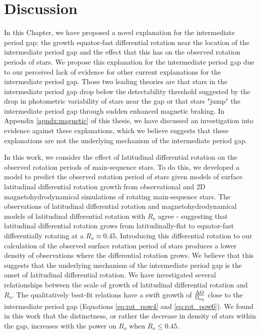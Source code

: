 \section{Discussion}
\label{sec:discussion}

In this Chapter, we have proposed a novel explanation for the intermediate period gap: the growth equator-fast differential rotation near the location of the intermediate period gap and the effect that this has on the observed rotation periods of stars.
We propose this explanation for the intermediate period gap due to our perceived lack of evidence for other current explanations for the intermediate period gap.
Those two leading theories are that stars in the intermediate period gap drop below the detectability threshold suggested by the drop in photometric variability of stars near the gap or that stars "jump" the intermediate period gap through sudden enhanced magnetic braking.
In Appendix \ref{apndx:magnetic} of this thesis, we have discussed an investigation into evidence against these explanations, which we believe suggests that these explanations are not the underlying mechanism of the intermediate period gap.

In this work, we consider the effect of latitudinal differential rotation on the observed rotation periods of main-sequence stars.
To do this, we developed a model to predict the observed rotation period of stars given models of surface latitudinal differential rotation growth from observational and 2D magnetohydrodynamical simulations of rotating main-sequence stars.
The observations of latitudinal differential rotation and magnetohydrodynamical models of latitudinal differential rotation with $R_o$ agree - suggesting that latitudinal differential rotation grows from latitudinally-flat to equator-fast differentially rotating at a $R_o \approx 0.45$.
Introducing this differential rotation to our calculation of the observed surface rotation period of stars produces a lower density of observations where the differential rotation grows.
We believe that this suggests that the underlying mechanism of the intermediate period gap is the onset of latitudinal differential rotation.
We have investigated several relationships between the scale of growth of latitudinal differential rotation and $R_o$. The qualitatively best-fit relations have a swift growth of $\frac{\Delta\Omega}{\Omega_{\rm{eq}}}$ close to the intermediate period gap (Equations \ref{eq:rot_pow4} and \ref{eq:rot_pow6}).
We found in this work that the distinctness, or rather the decrease in density of stars within the gap, increases with the power on $R_o$ when $R_o \leq 0.45$.

